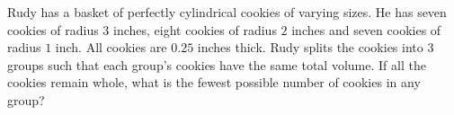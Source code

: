 Rudy has a basket of perfectly cylindrical cookies of varying sizes. He has seven cookies of radius $3$ inches, eight cookies of radius $2$ inches and seven cookies of radius $1$ inch. All cookies are $0.25$ inches thick. Rudy splits the cookies into $3$ groups such that each group's cookies have the same total volume. If all the cookies remain whole, what is the fewest possible number of cookies in any group?
